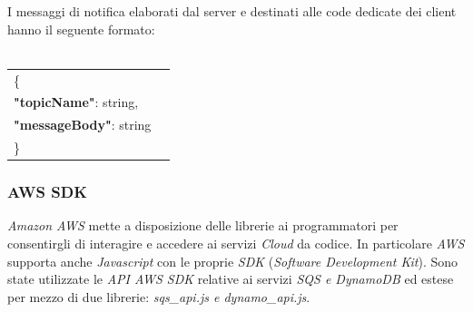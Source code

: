 \documentclass{article}
\begin{document}
I messaggi di notifica elaborati dal server e destinati alle code dedicate dei client hanno il seguente formato:
\\\\
\begin{tabular}{ll}
\{\\	   
           \hspace{10mm} \textbf{"topicName"}: string, \\
           \hspace{10mm} \textbf{"messageBody"}: string
\\
\}
\end{tabular}

\subsubsection{AWS SDK}
\textit{Amazon AWS} mette a disposizione delle librerie ai programmatori per consentirgli di interagire e accedere ai servizi \textit{Cloud} da codice. In particolare \textit{AWS} supporta anche \textit{Javascript} con le proprie \textit{SDK} (\textit{Software Development Kit}). Sono state utilizzate le \textit{API AWS SDK} relative ai servizi \textit{SQS e DynamoDB} ed estese per mezzo di due librerie: \textit{sqs\_api.js e dynamo\_api.js}.\\
\end{document}
